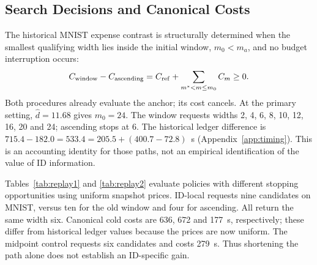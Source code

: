\documentclass[make,article,submit,pdftex,moreauthors]{Definitions/mdpi}
\begin{document}
\subsection{Search Decisions and Canonical Costs}\label{sec:replayresults}
The historical MNIST expense contrast is structurally determined when
the smallest qualifying width lies inside the initial window,
$m_0<m_a$, and no budget interruption occurs:
\begin{equation}
 C_{\rm window}-C_{\rm ascending}
 =C_{\rm ref}+\sum_{m^*<m\le m_0}C_m\ge0.
 \label{eq:dominance}
\end{equation}
Both procedures already evaluate the anchor; its cost cancels.
At the primary setting, $\hat d=11.68$ gives $m_0=24$.
The window requests widths 2, 4, 6, 8, 10, 12, 16, 20 and 24;
ascending stops at 6. The historical ledger difference is
$715.4-182.0=533.4=205.5+(400.7-72.8)$~s
(Appendix~\ref{app:timing}). This is an accounting identity for those
paths, not an empirical identification of the value of ID information.

Tables~\ref{tab:replay1} and \ref{tab:replay2} evaluate policies with
different stopping opportunities using uniform snapshot prices.
ID-local requests nine candidates on MNIST, versus ten for the old
window and four for ascending. All return the same width six.
Canonical cold costs are 636, 672 and 177~s, respectively; these differ
from historical ledger values because the prices are now uniform.
The midpoint control requests six candidates and costs 279~s.
Thus shortening the path alone does not establish an ID-specific gain.
\end{document}
